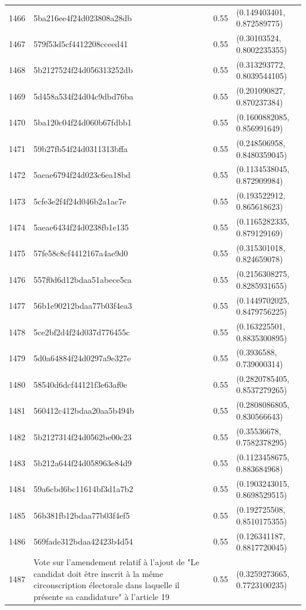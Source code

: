 \begin{table}[ht]
\begin{tabular}{rlrl}
  1466 & 5ba216ee4f24d023808a28db & 0.55 & (0.149403401, 0.872589775) \\ 
  1467 & 579f53d5cf4412208cceed41 & 0.55 & (0.30103524, 0.8002235355) \\ 
  1468 & 5b2127524f24d056313252db & 0.55 & (0.313293772, 0.8039544105) \\ 
  1469 & 5d458a534f24d04c9dbd76ba & 0.55 & (0.201090827, 0.870237384) \\ 
  1470 & 5ba120c04f24d060b67fdbb1 & 0.55 & (0.1600882085, 0.856991649) \\ 
  1471 & 59b27fb54f24d0311313bffa & 0.55 & (0.248506958, 0.8480359045) \\ 
  1472 & 5aeae6794f24d023c6ea18bd & 0.55 & (0.1134538045, 0.872909984) \\ 
  1473 & 5cfe3e2f4f24d046b2a1ac7e & 0.55 & (0.193522912, 0.865618623) \\ 
  1474 & 5aeae6434f24d0238fb1e135 & 0.55 & (0.1165282335, 0.879129169) \\ 
  1475 & 57fe58c8cf4412167a4ae9d0 & 0.55 & (0.315301018, 0.824659078) \\ 
  1476 & 557f0d6d12bdaa51abece5ca & 0.55 & (0.2156308275, 0.8285931655) \\ 
  1477 & 56b1e90212bdaa77b03f4ea3 & 0.55 & (0.1449702025, 0.8479756225) \\ 
  1478 & 5ce2bf2d4f24d037d776455c & 0.55 & (0.163225501, 0.8835300895) \\ 
  1479 & 5d0a64884f24d0297a9e327e & 0.55 & (0.3936588, 0.739000314) \\ 
  1480 & 58540d6dcf44121f3e63af0e & 0.55 & (0.2820785405, 0.8537279265) \\ 
  1481 & 560412c412bdaa20aa5b494b & 0.55 & (0.2808086805, 0.830566643) \\ 
  1482 & 5b2127314f24d0562be00c23 & 0.55 & (0.35536678, 0.7582378295) \\ 
  1483 & 5b212a644f24d058963e84d9 & 0.55 & (0.1123458675, 0.883684968) \\ 
  1484 & 59a6cbd6bc11614bf3d1a7b2 & 0.55 & (0.1903243015, 0.8698529515) \\ 
  1485 & 56b381fb12bdaa77b03f4ef5 & 0.55 & (0.192725508, 0.8510175355) \\ 
  1486 & 569fade312bdaa42423b4d54 & 0.55 & (0.126341187, 0.8817720045) \\ 
  1487 & Vote sur l'amendement relatif à l'ajout de "Le candidat doit être inscrit à la même circonscription électorale dans laquelle il présente sa candidature" à l'article 19 & 0.55 & (0.3259273665, 0.7723100235) \\ 

\end{tabular}
\end{table}

